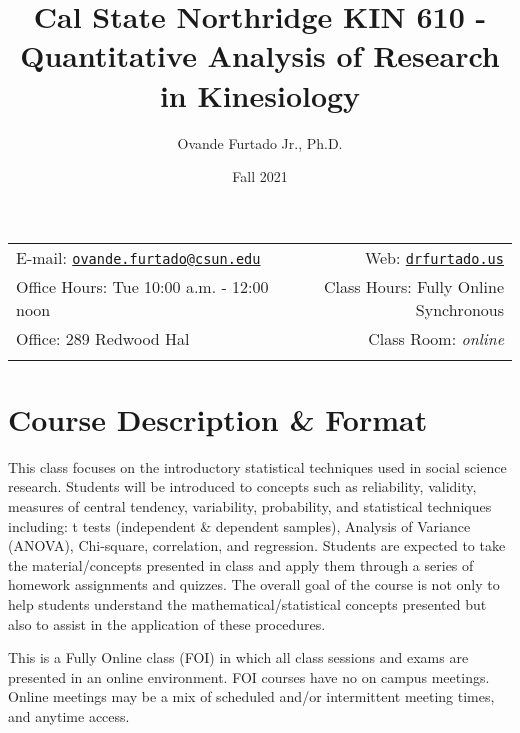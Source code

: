 \documentclass[11pt,]{article}
\title{Cal State Northridge \textbar{} KIN 610 - Quantitative Analysis
of Research in Kinesiology}
\author{Ovande Furtado Jr., Ph.D.}
\date{Fall 2021}
\begin{document}
  

		\maketitle
		
	
		\thispagestyle{firststyle}



	\noindent \begin{tabular*}{\textwidth}{ @{\extracolsep{\fill}} lr @{\extracolsep{\fill}}}


E-mail: \texttt{\href{mailto:ovande.furtado@csun.edu}{\nolinkurl{ovande.furtado@csun.edu}}} & Web: \href{http://drfurtado.us}{\tt drfurtado.us}\\
Office Hours: Tue 10:00 a.m. - 12:00 noon  &  Class Hours: Fully Online
Synchronous\\
Office: 289 Redwood Hal  & Class Room: \emph{online}\\
	&  \\
	\hline
	\end{tabular*}
	
\vspace{2mm}
	


\hypertarget{course-description-format}{%
\section{Course Description \& Format}\label{course-description-format}}

This class focuses on the introductory statistical techniques used in
social science research. Students will be introduced to concepts such as
reliability, validity, measures of central tendency, variability,
probability, and statistical techniques including: t tests (independent
\& dependent samples), Analysis of Variance (ANOVA), Chi-square,
correlation, and regression. Students are expected to take the
material/concepts presented in class and apply them through a series of
homework assignments and quizzes. The overall goal of the course is not
only to help students understand the mathematical/statistical concepts
presented but also to assist in the application of these procedures.

This is a Fully Online class (FOI) in which all class sessions and exams
are presented in an online environment. FOI courses have no on campus
meetings. Online meetings may be a mix of scheduled and/or intermittent
meeting times, and anytime access.
\end{document}
